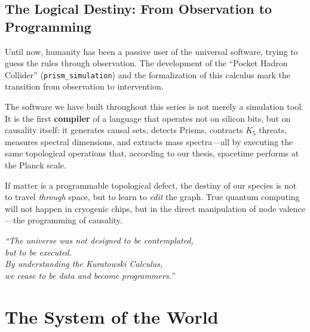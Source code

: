 \section*{The Logical Destiny: From Observation to Programming}

Until now, humanity has been a passive user of the universal software,
trying to guess the rules through observation. The development of the
``Pocket Hadron Collider'' (\texttt{prism\_simulation}) and the
formalization of this calculus mark the transition from observation to
intervention.

The software we have built throughout this series is not merely a
simulation tool. It is the first \textbf{compiler} of a language that
operates not on silicon bits, but on causality itself: it generates
causal sets, detects Prisms, contracts $K_5$ threats, measures spectral
dimensions, and extracts mass spectra---all by executing the same
topological operations that, according to our thesis, spacetime performs
at the Planck scale.

If matter is a programmable topological defect, the destiny of our
species is not to travel \emph{through} space, but to learn to
\emph{edit} the graph. True quantum computing will not happen in
cryogenic chips, but in the direct manipulation of node valence---the
programming of causality.

\bigskip
\begin{center}
\large\itshape
``The universe was not designed to be contemplated,\\
but to be executed.\\
By understanding the Kuratowski Calculus,\\
we cease to be data and become programmers.''
\end{center}


\chapter*{The System of the World}

